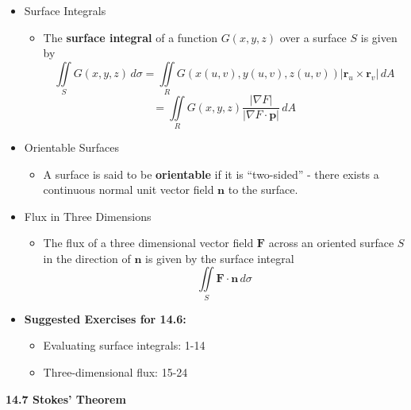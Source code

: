 \documentclass[12pt]{article}
\renewcommand{\vec}[1]{\mathbf{#1}}
\newcommand{\<}{\left<}
\renewcommand{\>}{\right>}
\begin{document}
  \begin{itemize}
    
  \item Surface Integrals
  
    \begin{itemize}
    \item The \textbf{surface integral} of a function $G(x,y,z)$ over a surface $S$ is given by \[
      \iint\limits_S G(x,y,z)\,d\sigma = \iint\limits_R G(x(u,v),y(u,v),z(u,v)) |\vec{r}_u\times \vec{r}_v|\,dA
    \]
    \[
      = \iint\limits_R G(x,y,z)\frac{|\nabla F|}{|\nabla F \cdot \vec{p}|}\,dA
      \]
    \end{itemize}
    
  \item Orientable Surfaces
    \begin{itemize}
    \item A surface is said to be \textbf{orientable} if it is ``two-sided'' - there exists a continuous normal unit vector field $\vec{n}$ to the surface.
    \end{itemize}
    
  \item Flux in Three Dimensions
  
    \begin{itemize}
    \item The flux of a three dimensional vector field $\vec{F}$ across an oriented surface $S$ in the direction of $\vec{n}$ is given by the surface integral \[\iint\limits_S \vec{F}\cdot\vec{n}\,d\sigma\]
    \end{itemize}
        
  \item \textbf{Suggested Exercises for 14.6:}
  
    \begin{itemize}
    \item Evaluating surface integrals: 1-14
    \item Three-dimensional flux: 15-24
    \end{itemize}
    
  \end{itemize}
  
  \newpage
  
  \centerline{\bf 14.7 Stokes' Theorem}
  
\end{document}
